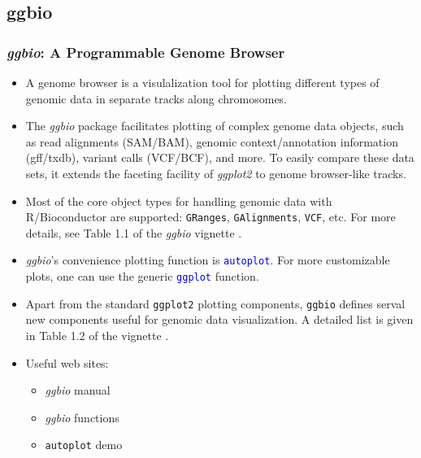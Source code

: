 \documentclass{beamer}
\newcommand{\Rfunction}[1]{{\texttt{#1}}}
\newcommand{\Robject}[1]{{\texttt{#1}}}
\newcommand{\Rpackage}[1]{{\textit{#1}}}
\newenvironment{changemargin}[2]{%
  \begin{list}{}{%
    \setlength{\topsep}{0pt}%
    \setlength{\leftmargin}{#1}%
    \setlength{\rightmargin}{#2}%
    \setlength{\listparindent}{\parindent}%
    \setlength{\itemindent}{\parindent}%
    \setlength{\parsep}{\parskip}%
  }%
  \item[]}{\end{list}}
\begin{document}
\subsection{ggbio}
\begin{frame}[containsverbatim]  
	\frametitle{\Rpackage{ggbio}: A Programmable Genome Browser}
\begin{changemargin}{-0.6cm}{-0.8cm}
\footnotesize 
\begin{itemize}
	\item A genome browser is a visulalization tool for plotting different types of genomic data in separate tracks along chromosomes. 
	\item The \Rpackage{ggbio} package \citep{Yin2012a} facilitates plotting of complex genome data objects, such as read alignments (SAM/BAM), genomic context/annotation information (gff/txdb), variant calls (VCF/BCF), and more. To easily compare these data sets, it extends the faceting facility of \Rpackage{ggplot2} to genome browser-like tracks.
	\item Most of the core object types for handling genomic data with R/Bioconductor are supported: \Robject{GRanges}, \Robject{GAlignments}, \Robject{VCF}, etc. For more details, see Table 1.1 of the \Rpackage{ggbio} vignette \href{http://www.bioconductor.org/packages/release/bioc/vignettes/ggbio/inst/doc/ggbio.pdf}{{}}.
	\item \Rpackage{ggbio}'s convenience plotting function is \textcolor{blue}{\Rfunction{autoplot}}. For more customizable plots, one can use the generic \textcolor{blue}{\Rfunction{ggplot}} function.
	\item Apart from the standard \Rfunction{ggplot2} plotting components, \Rfunction{ggbio} defines serval new components useful for genomic data visualization. A detailed list is given in Table 1.2 of the vignette \href{http://www.bioconductor.org/packages/release/bioc/vignettes/ggbio/inst/doc/ggbio.pdf}{{}}. 
	\item Useful web sites:
	\begin{itemize}
	\scriptsize
		\item \Rpackage{ggbio} manual \href{http://www.tengfei.name/ggbio/docs/}{{}}
		\item \Rpackage{ggbio} functions \href{http://www.tengfei.name/ggbio/docs/man/}{{}}
		\item \Rfunction{autoplot} demo \href{http://www.tengfei.name/ggbio/docs/man/autoplot-method.html}{{}}
	\end{itemize}
\end{itemize}
\end{changemargin}
\end{frame}
\end{document}
